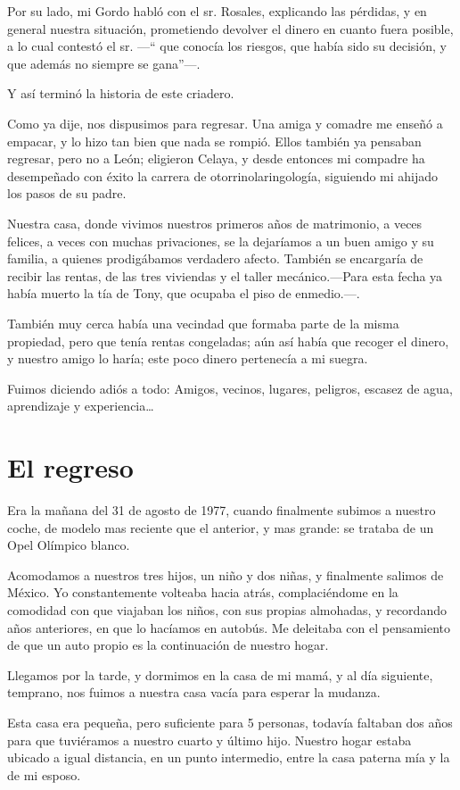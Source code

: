\documentclass[letterpaper, 12pt]{book}
\begin{document}
Por su lado, mi Gordo habló con el sr. Rosales, explicando las pérdidas, y en general nuestra situación, prometiendo devolver el dinero en cuanto fuera posible, a lo cual contestó el sr. ---`` que conocía los riesgos, que había  sido su decisión, y que además no siempre se gana''---.

Y así terminó la historia de este criadero.

Como ya dije, nos dispusimos para regresar. Una amiga y comadre me enseñó a empacar, y lo hizo tan bien que nada se rompió. Ellos también ya pensaban regresar, pero no a León; eligieron Celaya, y desde entonces mi compadre ha desempeñado con éxito la carrera de otorrinolaringología, siguiendo mi ahijado los pasos de su padre.

Nuestra casa, donde vivimos nuestros primeros años de matrimonio, a veces felices, a veces con muchas privaciones, se la dejaríamos a un buen amigo y su familia, a quienes prodigábamos verdadero afecto. También se encargaría de recibir las rentas, de las tres viviendas y el taller mecánico.---Para esta fecha ya había muerto la tía de Tony, que ocupaba el piso de enmedio.---.

También muy cerca había una vecindad que formaba parte de la misma propiedad, pero que tenía rentas congeladas; aún así había que recoger el dinero, y nuestro amigo lo haría; este poco dinero pertenecía a mi suegra.

Fuimos diciendo adiós a todo: Amigos, vecinos, lugares, peligros, escasez de agua, aprendizaje y experiencia\ldots
\chapter{El regreso}
Era la mañana del 31 de agosto de 1977, cuando finalmente subimos a nuestro coche, de modelo mas reciente que el anterior, y mas grande: se trataba de un Opel Olímpico blanco.

Acomodamos a nuestros tres hijos, un niño y dos niñas, y finalmente salimos de México. Yo constantemente volteaba hacia atrás, complaciéndome en la comodidad con que viajaban los niños, con sus propias almohadas, y recordando años anteriores, en que lo hacíamos en autobús. Me deleitaba con el pensamiento de que un auto propio es la continuación de nuestro hogar.

Llegamos por la tarde, y dormimos en la casa de mi mamá, y al día siguiente, temprano, nos fuimos a nuestra casa vacía para esperar la mudanza.

Esta casa era pequeña, pero suficiente para 5 personas, todavía faltaban dos años para que tuviéramos a nuestro cuarto y último hijo. Nuestro hogar estaba ubicado a igual distancia, en un punto intermedio, entre la casa paterna mía y la de mi esposo.
\end{document}
